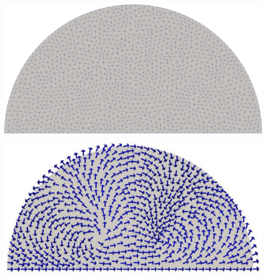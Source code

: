 \documentclass[a0paper,portrait, fontscale=0.30]{baposter}
\begin{document}
\begin{poster}
{%
\captionsetup{width=0.23\linewidth}
\captionsetup{labelformat=empty}
\noindent
\begin{minipage}[b]{0.23\linewidth}
\includegraphics[width=0.99\linewidth]{1}
\label{fig:figure1}
\end{minipage}
\begin{minipage}[b]{0.23\linewidth}
\includegraphics[width=0.99\linewidth]{2}
\label{fig:figure2}
\end{minipage}
\begin{minipage}[b]{0.23\linewidth}

\end{minipage}}
\end{poster}
\end{document}
